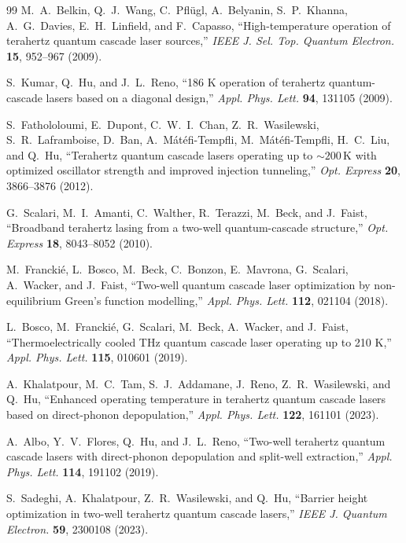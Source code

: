 \documentclass[11pt,letterpaper]{article}
\begin{document}
\begin{thebibliography}{99}
M.~A.~Belkin, Q.~J.~Wang, C.~Pfl\"ugl, A.~Belyanin, S.~P.~Khanna, A.~G.~Davies, E.~H.~Linfield, and F.~Capasso, ``High-temperature operation of terahertz quantum cascade laser sources,'' \textit{IEEE J. Sel. Top. Quantum Electron.} \textbf{15}, 952--967 (2009).

S.~Kumar, Q.~Hu, and J.~L.~Reno, ``186 K operation of terahertz quantum-cascade lasers based on a diagonal design,'' \textit{Appl. Phys. Lett.} \textbf{94}, 131105 (2009).

S.~Fathololoumi, E.~Dupont, C.~W.~I.~Chan, Z.~R.~Wasilewski, S.~R.~Laframboise, D.~Ban, A.~M\'at\'efi-Tempfli, M.~M\'at\'efi-Tempfli, H.~C.~Liu, and Q.~Hu, ``Terahertz quantum cascade lasers operating up to $\sim 200\,\mathrm{K}$ with optimized oscillator strength and improved injection tunneling,'' \textit{Opt. Express} \textbf{20}, 3866--3876 (2012).

G.~Scalari, M.~I.~Amanti, C.~Walther, R.~Terazzi, M.~Beck, and J.~Faist, ``Broadband terahertz lasing from a two-well quantum-cascade structure,'' \textit{Opt. Express} \textbf{18}, 8043--8052 (2010).

M.~Francki\'e, L.~Bosco, M.~Beck, C.~Bonzon, E.~Mavrona, G.~Scalari, A.~Wacker, and J.~Faist, ``Two-well quantum cascade laser optimization by non-equilibrium Green's function modelling,'' \textit{Appl. Phys. Lett.} \textbf{112}, 021104 (2018).

L.~Bosco, M.~Francki\'e, G.~Scalari, M.~Beck, A.~Wacker, and J.~Faist, ``Thermoelectrically cooled THz quantum cascade laser operating up to 210 K,'' \textit{Appl. Phys. Lett.} \textbf{115}, 010601 (2019).

A.~Khalatpour, M.~C.~Tam, S.~J.~Addamane, J.~Reno, Z.~R.~Wasilewski, and Q.~Hu, ``Enhanced operating temperature in terahertz quantum cascade lasers based on direct-phonon depopulation,'' \textit{Appl. Phys. Lett.} \textbf{122}, 161101 (2023).

A.~Albo, Y.~V.~Flores, Q.~Hu, and J.~L.~Reno, ``Two-well terahertz quantum cascade lasers with direct-phonon depopulation and split-well extraction,'' \textit{Appl. Phys. Lett.} \textbf{114}, 191102 (2019).

S.~Sadeghi, A.~Khalatpour, Z.~R.~Wasilewski, and Q.~Hu, ``Barrier height optimization in two-well terahertz quantum cascade lasers,'' \textit{IEEE J. Quantum Electron.} \textbf{59}, 2300108 (2023).


\end{thebibliography}
\end{document}
